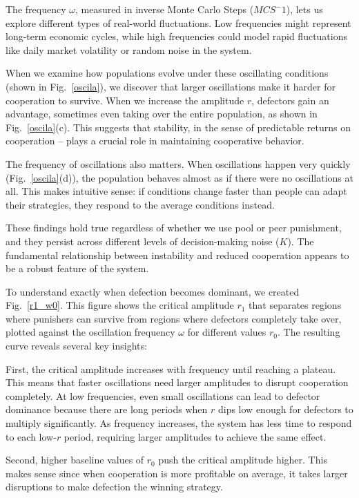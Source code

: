 The frequency $\omega$, measured in inverse Monte Carlo Steps ($MCS^-1$), lets us explore different types of real-world fluctuations. Low frequencies might represent long-term economic cycles, while high frequencies could model rapid fluctuations like daily market volatility or random noise in the system.

When we examine how populations evolve under these oscillating conditions (shown in Fig.~\ref{oscila}), we discover that larger oscillations make it harder for cooperation to survive. When we increase the amplitude $r$, defectors gain an advantage, sometimes even taking over the entire population, as shown in Fig.~\ref{oscila}(c). This suggests that stability, in the sense of predictable returns on cooperation – plays a crucial role in maintaining cooperative behavior.

The frequency of oscillations also matters. When oscillations happen very quickly (Fig.~\ref{oscila}(d)), the population behaves almost as if there were no oscillations at all. This makes intuitive sense: if conditions change faster than people can adapt their strategies, they respond to the average conditions instead.

These findings hold true regardless of whether we use pool or peer punishment, and they persist across different levels of decision-making noise ($K$). The fundamental relationship between instability and reduced cooperation appears to be a robust feature of the system.

To understand exactly when defection becomes dominant, we created Fig.~\ref{r1_w0}. This figure shows the critical amplitude $r_1$ that separates regions where punishers can survive from regions where defectors completely take over, plotted against the oscillation frequency $\omega$ for different values $r_0$. The resulting curve reveals several key insights:

First, the critical amplitude increases with frequency until reaching a plateau. This means that faster oscillations need larger amplitudes to disrupt cooperation completely. At low frequencies, even small oscillations can lead to defector dominance because there are long periods when $r$ dips low enough for defectors to multiply significantly. As frequency increases, the system has less time to respond to each low-$r$ period, requiring larger amplitudes to achieve the same effect.

Second, higher baseline values of $r_0$ push the critical amplitude higher. This makes sense since when cooperation is more profitable on average, it takes larger disruptions to make defection the winning strategy.

